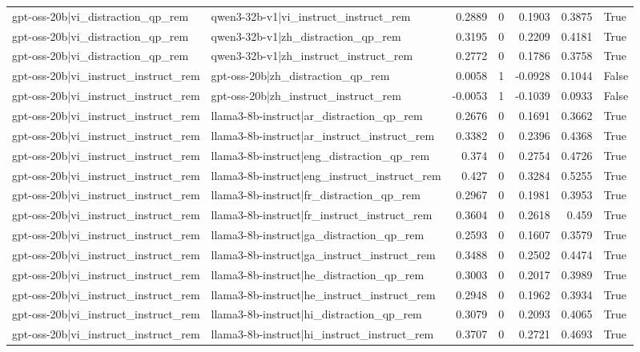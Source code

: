 \begin{table}
\begin{tabular}{l l r r r r l}
gpt-oss-20b|vi_distraction_qp_rem & qwen3-32b-v1|vi_instruct_instruct_rem & 0.2889 & 0 & 0.1903 & 0.3875 & True \\
gpt-oss-20b|vi_distraction_qp_rem & qwen3-32b-v1|zh_distraction_qp_rem & 0.3195 & 0 & 0.2209 & 0.4181 & True \\
gpt-oss-20b|vi_distraction_qp_rem & qwen3-32b-v1|zh_instruct_instruct_rem & 0.2772 & 0 & 0.1786 & 0.3758 & True \\
gpt-oss-20b|vi_instruct_instruct_rem & gpt-oss-20b|zh_distraction_qp_rem & 0.0058 & 1 & -0.0928 & 0.1044 & False \\
gpt-oss-20b|vi_instruct_instruct_rem & gpt-oss-20b|zh_instruct_instruct_rem & -0.0053 & 1 & -0.1039 & 0.0933 & False \\
gpt-oss-20b|vi_instruct_instruct_rem & llama3-8b-instruct|ar_distraction_qp_rem & 0.2676 & 0 & 0.1691 & 0.3662 & True \\
gpt-oss-20b|vi_instruct_instruct_rem & llama3-8b-instruct|ar_instruct_instruct_rem & 0.3382 & 0 & 0.2396 & 0.4368 & True \\
gpt-oss-20b|vi_instruct_instruct_rem & llama3-8b-instruct|eng_distraction_qp_rem & 0.374 & 0 & 0.2754 & 0.4726 & True \\
gpt-oss-20b|vi_instruct_instruct_rem & llama3-8b-instruct|eng_instruct_instruct_rem & 0.427 & 0 & 0.3284 & 0.5255 & True \\
gpt-oss-20b|vi_instruct_instruct_rem & llama3-8b-instruct|fr_distraction_qp_rem & 0.2967 & 0 & 0.1981 & 0.3953 & True \\
gpt-oss-20b|vi_instruct_instruct_rem & llama3-8b-instruct|fr_instruct_instruct_rem & 0.3604 & 0 & 0.2618 & 0.459 & True \\
gpt-oss-20b|vi_instruct_instruct_rem & llama3-8b-instruct|ga_distraction_qp_rem & 0.2593 & 0 & 0.1607 & 0.3579 & True \\
gpt-oss-20b|vi_instruct_instruct_rem & llama3-8b-instruct|ga_instruct_instruct_rem & 0.3488 & 0 & 0.2502 & 0.4474 & True \\
gpt-oss-20b|vi_instruct_instruct_rem & llama3-8b-instruct|he_distraction_qp_rem & 0.3003 & 0 & 0.2017 & 0.3989 & True \\
gpt-oss-20b|vi_instruct_instruct_rem & llama3-8b-instruct|he_instruct_instruct_rem & 0.2948 & 0 & 0.1962 & 0.3934 & True \\
gpt-oss-20b|vi_instruct_instruct_rem & llama3-8b-instruct|hi_distraction_qp_rem & 0.3079 & 0 & 0.2093 & 0.4065 & True \\
gpt-oss-20b|vi_instruct_instruct_rem & llama3-8b-instruct|hi_instruct_instruct_rem & 0.3707 & 0 & 0.2721 & 0.4693 & True \\

\end{tabular}
\end{table}
